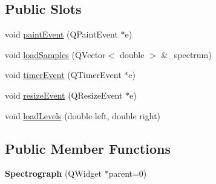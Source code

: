 \subsection*{Public Slots}
\begin{DoxyCompactItemize}
\item 
void \hyperlink{class_spectrograph_a22138fa296829fb5449202f262e64bf5}{paint\-Event} (Q\-Paint\-Event $\ast$e)
\item 
void \hyperlink{class_spectrograph_ae94e6b07459f40c57ed7db97f5d32cf1}{load\-Samples} (Q\-Vector$<$ double $>$ \&\-\_\-spectrum)
\item 
void \hyperlink{class_spectrograph_af690851ad862181732979bdfa88b2dbe}{timer\-Event} (Q\-Timer\-Event $\ast$e)
\item 
void \hyperlink{class_spectrograph_a06514c3f632bc47c7da2cfd66330e85e}{resize\-Event} (Q\-Resize\-Event $\ast$e)
\item 
void \hyperlink{class_spectrograph_aeb2d9200c513b1de462de5f16c4cb0ca}{load\-Levels} (double left, double right)
\end{DoxyCompactItemize}
\subsection*{Public Member Functions}
\begin{DoxyCompactItemize}
\item 
\hypertarget{class_spectrograph_ae4a10124a7de6cec48ccd09db0ab5fb6}{{\bfseries Spectrograph} (Q\-Widget $\ast$parent=0)}\label{class_spectrograph_ae4a10124a7de6cec48ccd09db0ab5fb6}

\end{DoxyCompactItemize}


